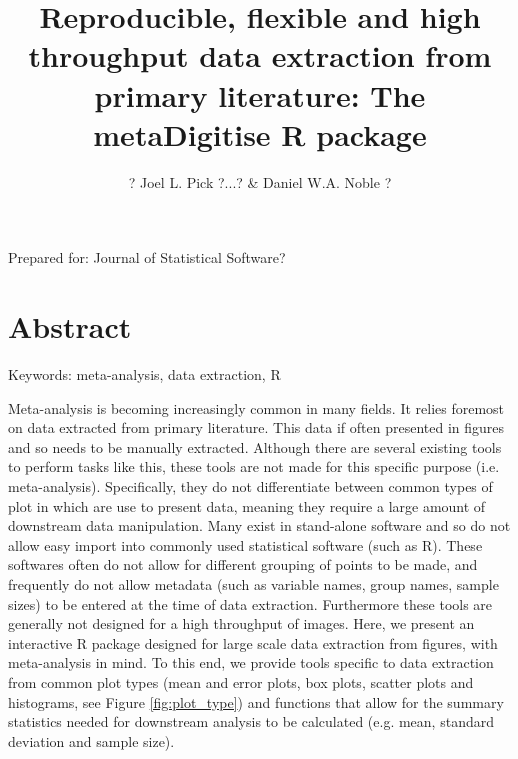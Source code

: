 \documentclass{article}
\title{Reproducible, flexible and high throughput data extraction from primary literature: The metaDigitise R package}
\author{? Joel L. Pick ?...? \& Daniel W.A. Noble ?}
\begin{document}
\doublespacing
\raggedright



\maketitle
Prepared for: Journal of Statistical Software?

\section*{Abstract}

Keywords: meta-analysis, data extraction, R

\clearpage



Meta-analysis is becoming increasingly common in many fields. It relies foremost on data extracted from primary literature. This data if often presented in figures and so needs to be manually extracted. Although there are several existing tools to perform tasks like this, these tools are not made for this specific purpose (i.e. meta-analysis).
Specifically, they do not differentiate between common types of plot in which are use to present data, meaning they require a large amount of downstream data manipulation. Many exist in stand-alone software and so do not allow easy import into commonly used statistical software (such as R). These softwares often do not allow for different grouping of points to be made, and frequently do not allow metadata (such as variable names, group names, sample sizes) to be entered at the time of data extraction. Furthermore these tools are generally not designed for a high throughput of images. 
Here, we present an interactive R package designed for large scale data extraction from figures, with meta-analysis in mind. To this end, we provide tools specific to data extraction from common plot types (mean and error plots, box plots, scatter plots and histograms, see Figure \ref{fig:plot_type}) and functions that allow for the summary statistics needed for downstream analysis to be calculated (e.g. mean, standard deviation and sample size). %
\end{document}
